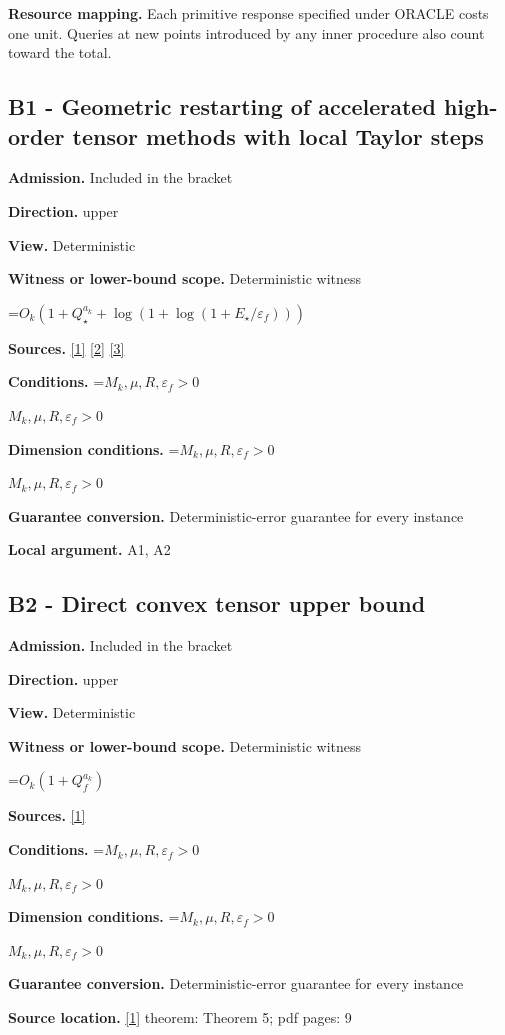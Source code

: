 \documentclass[10pt,a4paper]{article}
\newcommand{\AtlasMath}[1]{\par\begingroup\centering\setbox0=\hbox{$\displaystyle #1$}\ifdim\wd0>1.4\linewidth\typeout{ATLAS WIDE FORMULA: \the\wd0}\fi\ifdim\wd0>\linewidth\resizebox{\linewidth}{!}{\box0}\else\box0\fi\par\endgroup}
\newcommand{\AtlasInlineMath}[1]{\begingroup\setbox0=\hbox{$#1$}\ifdim\wd0>.4\linewidth\endgroup\AtlasMath{#1}\else\endgroup$#1$\fi}
\begin{document}
\textbf{Resource mapping.} Each primitive response specified under ORACLE costs one unit. Queries at new points introduced by any inner procedure also count toward the total.

\subsection{B1 - Geometric restarting of accelerated high-order tensor methods with local Taylor steps}
\textbf{Admission.} Included in the bracket

\textbf{Direction.} upper

\textbf{View.} Deterministic

\textbf{Witness or lower-bound scope.} Deterministic witness

\AtlasMath{O_k(1+Q_\star^{a_k}+\log(1+\log(1+E_\star/\varepsilon_f)))}
\textbf{Sources.} \href{https://arxiv.org/pdf/2205.09647v1}{[1]} \href{https://arxiv.org/pdf/2010.06642v2}{[2]} \href{https://arxiv.org/pdf/1705.07260v2}{[3]}

\textbf{Conditions.} \AtlasInlineMath{M_k,\mu,R,\varepsilon_f>0}

\textbf{Dimension conditions.} \AtlasInlineMath{M_k,\mu,R,\varepsilon_f>0}

\textbf{Guarantee conversion.} Deterministic-error guarantee for every instance

\textbf{Local argument.} A1, A2

\subsection{B2 - Direct convex tensor upper bound}
\textbf{Admission.} Included in the bracket

\textbf{Direction.} upper

\textbf{View.} Deterministic

\textbf{Witness or lower-bound scope.} Deterministic witness

\AtlasMath{O_k(1+Q_f^{a_k})}
\textbf{Sources.} \href{https://arxiv.org/pdf/2205.09647v1}{[1]}

\textbf{Conditions.} \AtlasInlineMath{M_k,\mu,R,\varepsilon_f>0}

\textbf{Dimension conditions.} \AtlasInlineMath{M_k,\mu,R,\varepsilon_f>0}

\textbf{Guarantee conversion.} Deterministic-error guarantee for every instance

\textbf{Source location.} \href{https://arxiv.org/pdf/2205.09647v1}{[1]} theorem: Theorem 5; pdf pages: 9
\end{document}
